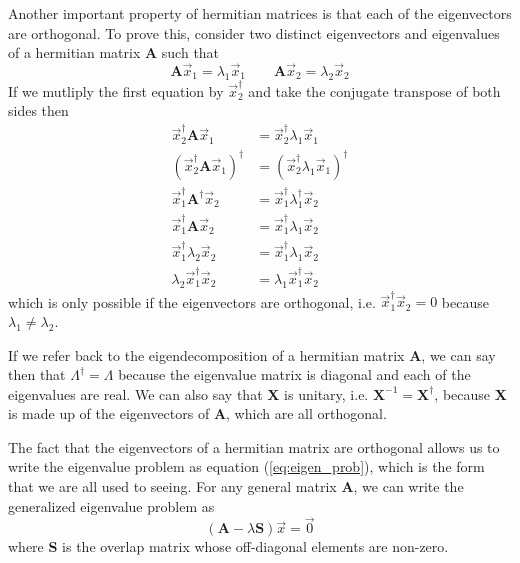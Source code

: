 \documentclass{article}
\newcommand{\be}{\begin{equation}}
\newcommand{\ee}{\end{equation}}
\begin{document}
Another important property of hermitian matrices is that each of the eigenvectors are orthogonal.
To prove this, consider two distinct eigenvectors and eigenvalues of a hermitian matrix \textbf{A} such that
\be
  \textbf{A} \vec{x}_1 = \lambda_1 \vec{x}_1 \quad \quad \textbf{A} \vec{x}_2 = \lambda_2 \vec{x}_2
\ee
If we mutliply the first equation by $\vec{x}_2^{\dagger}$ and take the conjugate transpose of both sides then
\be
  \begin{split}
    \vec{x}_2^{\dagger} \textbf{A} \vec{x}_1 &= \vec{x}_2^{\dagger} \lambda_1  \vec{x}_1 \\
    (\vec{x}_2^{\dagger} \textbf{A} \vec{x}_1)^{\dagger} &= (\vec{x}_2^{\dagger} \lambda_1  \vec{x}_1)^{\dagger} \\
    \vec{x}_1^{\dagger} \textbf{A}^{\dagger} \vec{x}_2 &= \vec{x}_1^{\dagger} \lambda_1^{\dagger} \vec{x}_2 \\
    \vec{x}_1^{\dagger} \textbf{A} \vec{x}_2 &= \vec{x}_1^{\dagger} \lambda_1 \vec{x}_2 \\
    \vec{x}_1^{\dagger} \lambda_2 \vec{x}_2 &= \vec{x}_1^{\dagger} \lambda_1 \vec{x}_2 \\
    \lambda_2 \vec{x}_1^{\dagger} \vec{x}_2 &= \lambda_1 \vec{x}_1^{\dagger} \vec{x}_2
  \end{split}
\ee
which is only possible if the eigenvectors are orthogonal, i.e. $\vec{x}_1^{\dagger} \vec{x}_2 = 0$ because $\lambda_1 \neq \lambda_2$.

If we refer back to the eigendecomposition of a hermitian matrix \textbf{A}, we can say then that $\Lambda^{\dagger} = \Lambda$ because the eigenvalue matrix is diagonal and each of the eigenvalues are real.
We can also say that \textbf{X} is unitary, i.e. $\textbf{X}^{-1} = \textbf{X}^{\dagger}$, because \textbf{X} is made up of the eigenvectors of \textbf{A}, which are all orthogonal.

The fact that the eigenvectors of a hermitian matrix are orthogonal allows us to write the eigenvalue problem as equation (\ref{eq:eigen_prob}), which is the form that we are all used to seeing.
For any general matrix \textbf{A}, we can write the generalized eigenvalue problem as
\be
  (\textbf{A} - \lambda \textbf{S}) \vec{x} = \vec{0}
\ee
where \textbf{S} is the overlap matrix whose off-diagonal elements are non-zero.
\end{document}
